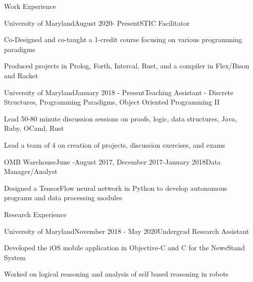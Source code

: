 \documentclass{resume} %
\begin{document}
\begin{rSection}{Work Experience}

\begin{rSubsection}{University of Maryland}{August 2020- Present}{STIC Facilitator}{}
\item Co-Designed and co-taught a 1-credit course focusing on various programming paradigms
\item Produced projects in Prolog, Forth, Intercal, Rust, and a compiler in Flex/Bison and Racket
\end{rSubsection}

\begin{rSubsection}{University of Maryland}{January 2018 - Present}{Teaching Assistant - Discrete Structures, Programming Paradigms, Object Oriented Programming II}{}
\item Lead 50-80 minute discussion sessions on proofs, logic, data structures, Java, Ruby, OCaml, Rust
\item Lead a team of 4 on creation of projects, discussion exercises, and exams 
\end{rSubsection}


\begin{rSubsection}{OMB Warehouse}{June -August 2017, December 2017-January 2018}{Data Manager/Analyst}{}
\item Designed a TensorFlow neural network in Python to develop autonomous programs and data processing modules
\end{rSubsection}

\end{rSection}



\begin{rSection}{Research Experience}

\begin{rSubsection}{University of Maryland}{November 2018 - May 2020}{Undergrad Research Assistant}{}
\item Developed the iOS mobile application in Objective-C and C for the NewsStand System
\item Worked on logical reasoning and analysis of self based reasoning in robots
\end{rSubsection}

\end{rSection}
\end{document}

